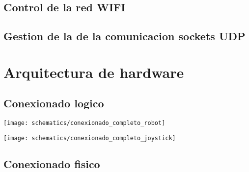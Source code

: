 \subsection{Control de la red WIFI}
\subsection{Gestion de la  de la comunicacion sockets UDP}



\section{Arquitectura de hardware}


\subsection{Conexionado logico }


\begin{center}
  \texttt{[image: schematics/conexionado\_completo\_robot]}
    \label{fig:conexionado_completo_robot}
\end{center}



\begin{center}
  \texttt{[image: schematics/conexionado\_completo\_joystick]}
    \label{fig:conexionado_completo_joystick}
\end{center}


\subsection{Conexionado fisico }



